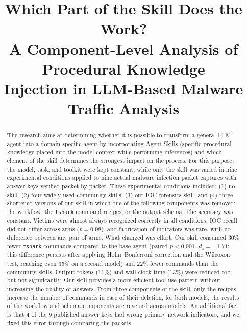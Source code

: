 \documentclass[conference]{IEEEtran}
\begin{document}
\title{\fontsize{21}{25}\selectfont Which Part of the Skill Does the Work?\\A Component-Level Analysis of Procedural Knowledge\\Injection in LLM-Based Malware Traffic Analysis}

\author{
}

\maketitle

\begin{abstract}
The research aims at determining whether it is possible to transform a general LLM agent
into a domain-specific agent by incorporating Agent Skills (specific procedural knowledge
placed into the model context while performing inferences) and which element of the skill
determines the strongest impact on the process. For this purpose, the model, task, and
toolkit were kept constant, while only the skill was varied in nine experimental conditions
applied to nine actual malware infection packet captures with answer keys verified packet by
packet. These experimental conditions included: (1) no skill, (2) four widely used community
skills, (3) our IOC-forensics skill, and (4) three shortened versions of our skill in which
one of the following components was removed: the workflow, the \texttt{tshark} command
recipes, or the output schema. The accuracy was constant. Victims were almost always
recognized correctly in all conditions, IOC recall did not differ across arms ($p{=}0.08$),
and fabrication of indicators was rare, with no difference between any pair of arms. What
changed was effort. Our skill consumed 30\% fewer \texttt{tshark} commands compared to the
base agent (paired $p{<}0.001$, $d_z{=}{-}1.71$; this difference persists after applying
Holm--Bonferroni correction and the Wilcoxon test, reaching even 35\% on a second model) and
22\% fewer commands than the community skills. Output tokens (11\%) and wall-clock time
(13\%) were reduced too, but not significantly. Our skill provides a more efficient tool-use
pattern without increasing the quality of answers. From three components of the skill, only
the recipes increase the number of commands in case of their deletion, for both models; the
results of the workflow and schema components are reversed across models. An additional fact
is that 4 of the 9 published answer keys had wrong primary network indicators, and we fixed
this error through comparing the packets.
\end{abstract}
\end{document}
